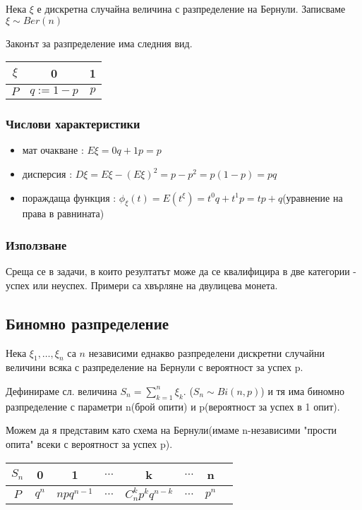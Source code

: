 \documentclass[fleqn,12pt]{article}
\begin{document}
\begin{justify}
Нека $\xi$ е дискретна случайна величина с разпределение на Бернули. Записваме $\xi \sim Ber(n)$

Законът за разпределение има следния вид.
\begin{tabular}{|c|c|c|}
    \hline
    $\xi$ & 0 & 1 \\
    \hline
    $P$ & $q := 1 - p$ & $p$ \\
    \hline
\end{tabular}

\subsubsection{Числови характеристики} 
\begin{itemize}
    \item мат очакване : $E\xi = 0q + 1p = p$
    \item дисперсия : $D\xi = E\xi - (E\xi)^2 = p - p^2 = p(1-p)  = pq$
    \item пораждаща функция : $\phi_\xi(t) = E(t^\xi) = t^0q + t^1p = tp + q$(уравнение на права в равнината)
\end{itemize}

\subsubsection{Използване} 
Среща се в задачи, в които резултатът може да се квалифицира в две категории - успех или неуспех. Примери са хвърляне 
на двулицева монета.

\subsection{Биномно разпределение}
Нека $\xi_1, \dots, \xi_n$ са $n$ независими еднакво разпределени дискретни случайни величини всяка с разпределение на 
Бернули с вероятност за успех p.

Дефинираме сл. величина $S_n = \sum_{k=1}^n \xi_k$. ($S_n \sim Bi(n,p)$) и тя има биномно разпределение с параметри n(брой
опити) и p(вероятност за успех в 1 опит).

Можем да я представим като схема на Бернули(имаме n-независими "прости опита" всеки с вероятност за успех p).

\begin{tabular}{|c|c|c|c|c|c|c|c|}
    \hline
    $S_n$ & 0 & 1 & $\dots$ & k & $\dots$ & n \\
    \hline
    $P$ & $q^n$ & $n p q^{n-1}$ & $\dots$ & $C_n^k p^k q^{n-k}$ & $\dots$ & $p^n$ \\
    \hline
\end{tabular}


\end{justify}
\end{document}
